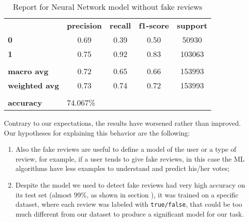 \begin{table}[h!]
    \centering
    \begin{tabular}{lcccc}
        \rowcolor[HTML]{EEEEEE} 
        \cellcolor[HTML]{FBFBFB} & \textbf{precision} & \textbf{recall} & \textbf{f1-score} & \textbf{support} \\
        \rowcolor[HTML]{EEEEEE} 
        \textbf{0}               & 0.69               & 0.39            & 0.50              & 50930            \\
        \rowcolor[HTML]{EEEEEE} 
        \textbf{1}               & 0.75               & 0.92            & 0.83              & 103063           \\
        \rowcolor[HTML]{FBFBFB} 
        &                    &                 &                   &                  \\
        \rowcolor[HTML]{EEEEEE} 
        \textbf{macro avg}       & 0.72               & 0.65            & 0.66              & 153993           \\
        \rowcolor[HTML]{EEEEEE} 
        \textbf{weighted avg}    & 0.73               & 0.74            & 0.72              & 153993           \\
        \rowcolor[HTML]{FBFBFB} 
        &                    &                 &                   &                  \\
        \rowcolor[HTML]{EEEEEE} 
        \textbf{accuracy}        & \multicolumn{4}{l}{\cellcolor[HTML]{EEEEEE}74.067\%}                         
    \end{tabular}
    \caption{Report for Neural Network model without fake reviews}
    \label{tab:nn-res-no-fake}
\end{table}

Contrary to our expectations, the results have worsened rather than improved.\\
Our hypotheses for explaining this behavior are the following:
\begin{enumerate}
    \item Also the fake reviews are useful to define a model of the user or a type of review, for example, if a user tends to give fake reviews, in this case the ML algorithms have less examples to understand and predict his/her votes;
    \item Despite the model we used to detect fake reviews had very high accuracy on its test set (almost 99\%, as shown in section ), it was trained on a specific dataset, where each review was labeled with  \texttt{true/false}, that could be too much different from our dataset to produce a significant model for our task.
\end{enumerate}


